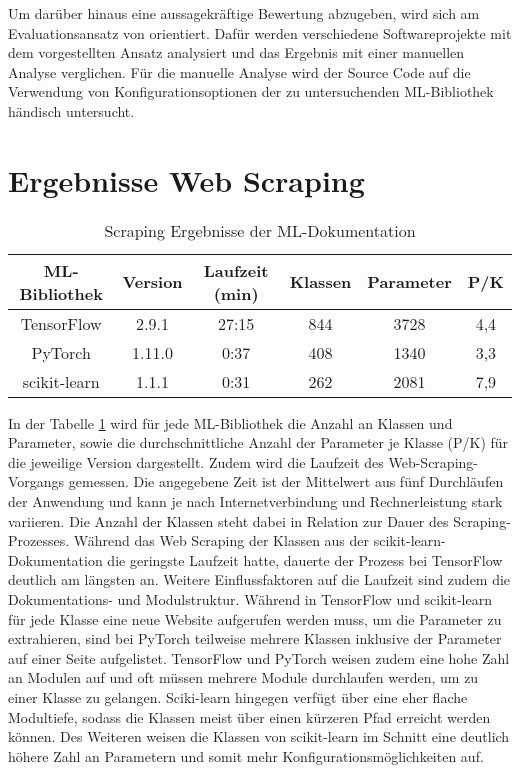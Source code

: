 \documentclass[german,bachelor]{swsLeipzig}
\begin{document}
Um darüber hinaus eine aussagekräftige Bewertung abzugeben, wird sich am Evaluationsansatz von \citeauthor{10.1145/1985793.1985812}
orientiert.
Dafür werden verschiedene Softwareprojekte mit dem vorgestellten Ansatz analysiert und das Ergebnis mit einer manuellen Analyse verglichen.
Für die manuelle Analyse wird der Source Code auf die Verwendung von Konfigurationsoptionen der zu untersuchenden ML-Bibliothek
händisch untersucht.\\

\section{Ergebnisse Web Scraping}
\begin{table}[H]
\small
\begin{center}
\begin{tabular}[h]{c|c|c|c|c|c}
\hline
ML-Bibliothek & Version & Laufzeit (min) & Klassen & Parameter & P/K\\
\hline \hline
TensorFlow & 2.9.1 & 27:15 & 844 & 3728 & 4,4\\
PyTorch & 1.11.0 & 0:37 & 408 & 1340 & 3,3 \\
scikit-learn & 1.1.1 & 0:31 & 262 & 2081 & 7,9\\
\hline
\end{tabular}
\caption{Scraping Ergebnisse der ML-Dokumentation} \label{scrapresults}
\end{center}
\end{table}

In der Tabelle \ref{scrapresults} wird für jede ML-Bibliothek die Anzahl an Klassen und Parameter, sowie die durchschnittliche
Anzahl der Parameter je Klasse (P/K) für die jeweilige Version dargestellt.
Zudem wird die Laufzeit des Web-Scraping-Vorgangs gemessen.
Die angegebene Zeit ist der Mittelwert aus fünf Durchläufen der Anwendung und kann je nach Internetverbindung und Rechnerleistung
stark variieren.
Die Anzahl der Klassen steht dabei in Relation zur Dauer des Scraping-Prozesses.
Während das Web Scraping der Klassen aus der scikit-learn-Dokumentation die geringste Laufzeit hatte,
dauerte der Prozess bei TensorFlow deutlich am längsten an.
Weitere Einflussfaktoren auf die Laufzeit sind zudem die Dokumentations- und Modulstruktur.
Während in TensorFlow und scikit-learn für jede Klasse eine neue Website aufgerufen werden muss, um die Parameter zu extrahieren,
sind bei PyTorch teilweise mehrere Klassen inklusive der Parameter auf einer Seite aufgelistet.
TensorFlow und PyTorch weisen zudem eine hohe Zahl an Modulen auf und oft müssen mehrere Module durchlaufen werden, um zu einer Klasse zu gelangen.
Sciki-learn hingegen verfügt über eine eher flache Modultiefe, sodass die Klassen meist über einen kürzeren Pfad erreicht werden können.
Des Weiteren weisen die Klassen von scikit-learn im Schnitt eine deutlich höhere Zahl an Parametern und somit mehr Konfigurationsmöglichkeiten auf.
\\
\end{document}
